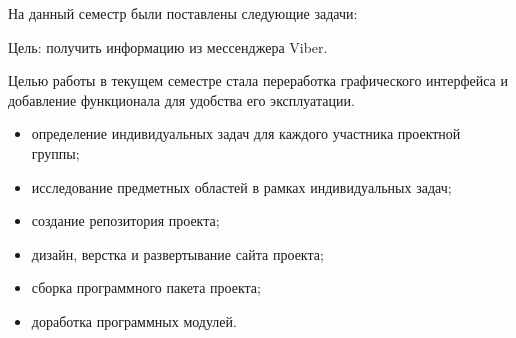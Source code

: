 На данный семестр были поставлены следующие задачи:

	Цель: получить информацию из мессенджера Viber.
	
	Целью работы в текущем семестре стала переработка графического интерфейса и добавление функционала для удобства его эксплуатации.

\begin{itemize}
  \item определение индивидуальных задач для каждого участника проектной группы;
  \item исследование предметных областей в рамках индивидуальных задач; 
  \item создание репозитория проекта;
  \item дизайн, верстка и развертывание сайта проекта;
  \item сборка программного пакета проекта;   
  \item доработка программных модулей.
\end{itemize}
